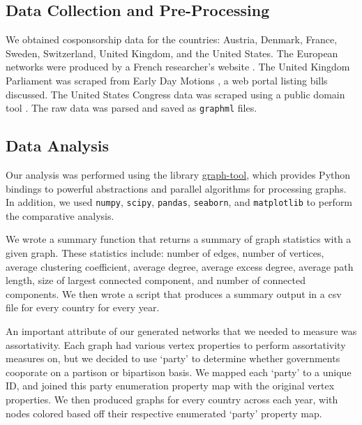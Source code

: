 \documentclass[12pt]{article}
\newcommand{\code}[1]{\small\texttt{#1}}
\begin{document}
\begin{multicols*}{2}
\subsection{Data Collection and Pre-Processing}
We obtained cosponsorship data for the countries: Austria, Denmark, France, Sweden, Switzerland, United Kingdom, and the United States. The European networks were produced by a French researcher's website \cite{briatte}. The United Kingdom Parliament was scraped from Early Day Motions \cite{UK}, a web portal listing bills discussed. The United States Congress data was scraped using a public domain tool \cite{US}. The raw data was parsed and saved as \code{graphml} files. 

\subsection{Data Analysis}

Our analysis was performed using the library \href{https://graph-tool.skewed.de}{graph-tool}, which provides Python bindings to powerful abstractions and parallel algorithms for processing graphs. In addition, we used \texttt{numpy}, \texttt{scipy}, \texttt{pandas}, \texttt{seaborn}, and \texttt{matplotlib} to perform the comparative analysis.

We wrote a summary function that returns a summary of graph statistics with a given graph. These statistics include: number of edges, number of vertices, average clustering coefficient, average degree, average excess degree, average path length, size of largest connected component, and number of connected components. We then wrote a script that produces a summary output in a csv file for every country for every year. 

An important attribute of our generated networks that we needed to measure was assortativity. Each graph had various vertex properties to perform assortativity measures on, but we decided to use `party' to determine whether governments cooporate on a partison or bipartison basis. We mapped each `party' to a unique ID, and joined this party enumeration property map with the original vertex properties. We then produced graphs for every country across each year, with nodes colored based off their respective enumerated `party' property map.


\end{multicols*}
\end{document}
